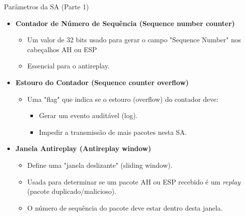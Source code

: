 \begin{frame}{Parâmetros da SA (Parte 1)}
    \begin{itemize}
        \item \textbf{Contador de Número de Sequência (Sequence number counter)}
              \begin{itemize}
                  \item Um valor de 32 bits usado para gerar o campo "Sequence Number" nos cabeçalhos AH ou ESP
                  \item Essencial para o antireplay.
              \end{itemize}

        \item \textbf{Estouro do Contador (Sequence counter overflow)}
              \begin{itemize}
                  \item Uma "flag" que indica se o estouro (overflow) do contador deve:
                        \begin{itemize}
                            \item Gerar um evento auditável (log).
                            \item Impedir a transmissão de mais pacotes nesta SA.
                        \end{itemize}
              \end{itemize}

        \item \textbf{Janela Antireplay (Antireplay window)}
              \begin{itemize}
                  \item Define uma "janela deslizante" (sliding window).
                  \item Usada para determinar se um pacote AH ou ESP recebido é um \textit{replay} (pacote duplicado/malicioso).
                  \item O número de sequência do pacote deve estar dentro desta janela.
              \end{itemize}
    \end{itemize}
\end{frame}

